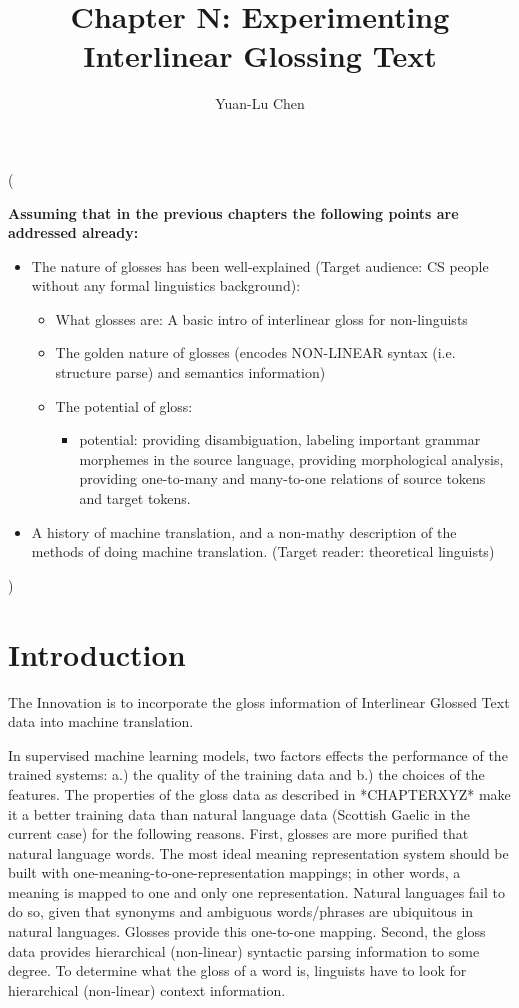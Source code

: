 \documentclass[a4paper]{article}
\title{Chapter N: Experimenting Interlinear Glossing Text}
\author{Yuan-Lu Chen}
\begin{document}



\maketitle

(

\textbf{Assuming that in the previous chapters the following points are addressed already:} 
\begin{itemize}
\item The nature of glosses has been well-explained  (Target audience: CS people without any formal linguistics background):
	\begin{itemize}
	\item What glosses are: A basic intro of interlinear gloss for non-linguists
    \item The golden nature of glosses (encodes NON-LINEAR syntax (i.e. structure parse) and semantics information) 
    \item The potential of gloss:	
		\begin{itemize}
		\item potential: providing disambiguation, labeling important grammar morphemes in the source language, providing morphological analysis, providing one-to-many and many-to-one relations of source tokens and target tokens.  
		\end{itemize}
	\end{itemize}
\item A history of machine translation, and a non-mathy description of the methods of doing machine translation. (Target reader: theoretical linguists)
\end{itemize}


)

\section{Introduction}
The Innovation is to incorporate the gloss information of Interlinear Glossed Text data into machine translation. 

In supervised machine learning models, two factors effects the performance of the trained systems:
a.) the quality of the training data and b.) the choices of the features. The properties of the gloss data as described in *CHAPTERXYZ* make it a better training data than natural language data (Scottish Gaelic in the current case) for the following reasons. 
First, glosses are more purified that natural language words. 
The most ideal meaning representation system should be built with one-meaning-to-one-representation mappings; in other words, a meaning is mapped to one and only one representation. 
Natural languages fail to do so, given that synonyms and ambiguous words/phrases are ubiquitous in natural languages. Glosses provide this one-to-one mapping. 
Second, the gloss data provides hierarchical (non-linear) syntactic parsing information to some degree. To determine what the gloss of a word is, linguists have to look for hierarchical (non-linear) context information. 
\end{document}
